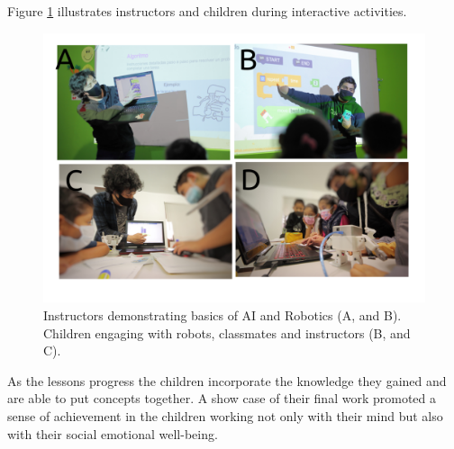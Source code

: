 \documentclass[conference]{IEEEtran}
\begin{document}
Figure \ref{fig:pilot} illustrates instructors and children during interactive activities. 
\begin{figure}[htbp]
    \includegraphics[width=\linewidth]{piloting-workshops/versions/drawing-v00.png} %
    \caption{
        Instructors demonstrating basics of AI and Robotics (A, and B). 
        Children engaging with robots, classmates and instructors (B, and C).
        }
    \label{fig:pilot}
\end{figure}

As the lessons progress the children incorporate the knowledge they gained and are able to put concepts together. 
A show case of their final work promoted a sense of achievement in the children working not only with their mind but also with their social emotional well-being. 


    
\end{document}
